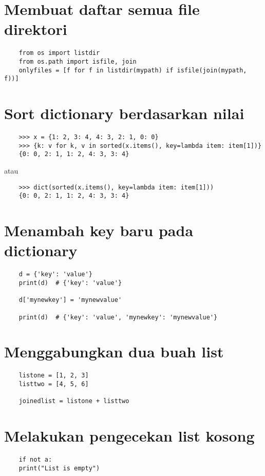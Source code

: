 \documentclass{article}
\begin{document}
\section {Membuat daftar semua file direktori}
\begin{lstlisting}
	from os import listdir
	from os.path import isfile, join
	onlyfiles = [f for f in listdir(mypath) if isfile(join(mypath, f))]
\end{lstlisting}

\section {Sort dictionary berdasarkan nilai}
\begin{lstlisting}
	>>> x = {1: 2, 3: 4, 4: 3, 2: 1, 0: 0}
	>>> {k: v for k, v in sorted(x.items(), key=lambda item: item[1])}
	{0: 0, 2: 1, 1: 2, 4: 3, 3: 4}
\end{lstlisting}
atau
\begin{lstlisting}
	>>> dict(sorted(x.items(), key=lambda item: item[1]))
	{0: 0, 2: 1, 1: 2, 4: 3, 3: 4}
\end{lstlisting}

\section {Menambah key baru pada dictionary}
\begin{lstlisting}
	d = {'key': 'value'}
	print(d)  # {'key': 'value'}
	
	d['mynewkey'] = 'mynewvalue'
	
	print(d)  # {'key': 'value', 'mynewkey': 'mynewvalue'}
\end{lstlisting}

\section {Menggabungkan dua buah list}
\begin{lstlisting}
	listone = [1, 2, 3]
	listtwo = [4, 5, 6]
	
	joinedlist = listone + listtwo
\end{lstlisting}

\section {Melakukan pengecekan list kosong}
\begin{lstlisting}
	if not a:
	print("List is empty")
\end{lstlisting}
\end{document}
